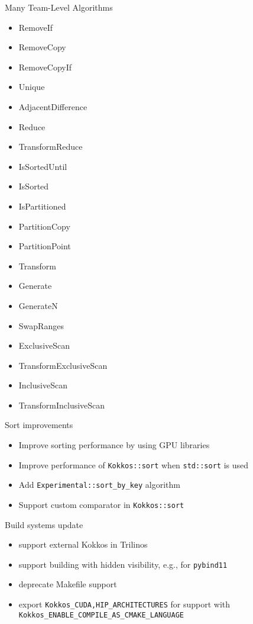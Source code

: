 \begin{frame}[fragile]{Many Team-Level Algorithms}
\begin{itemize}
    \item RemoveIf
    \item RemoveCopy
    \item RemoveCopyIf
    \item Unique
    \item AdjacentDifference
    \item Reduce
    \item TransformReduce
    \item IsSortedUntil
    \item IsSorted
    \item IsPartitioned
    \item PartitionCopy
    \item PartitionPoint
    \item Transform
    \item Generate
    \item GenerateN
    \item SwapRanges
    \item ExclusiveScan
    \item TransformExclusiveScan
    \item InclusiveScan
    \item TransformInclusiveScan
\end{itemize}
\end{frame}

\begin{frame}[fragile]{Sort improvements}
  \begin{itemize}
\item Improve sorting performance by using GPU libraries
\item Improve performance of \texttt{Kokkos::sort} when \texttt{std::sort} is used
\item Add \texttt{Experimental::sort\_by\_key} algorithm
\item Support custom comparator in \texttt{Kokkos::sort}
  \end{itemize}
\end{frame}

\begin{frame}[fragile]{Build systems update}
  \begin{itemize}
    \item support external Kokkos in Trilinos
    \item support building with hidden visibility, e.g., for \texttt{pybind11}
    \item deprecate Makefile support
    \item export \texttt{Kokkos\_{CUDA,HIP}\_ARCHITECTURES} for support with \texttt{Kokkos\_ENABLE\_COMPILE\_AS\_CMAKE\_LANGUAGE}
  \end{itemize}
\end{frame}

